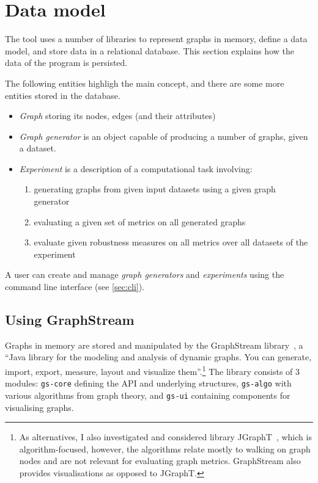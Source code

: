 \section{Data model}

The \graffs tool uses a number of libraries to represent graphs in memory, define a data model, and store data in a relational database.
This section explains how the data of the program is persisted.

The following entities highligh the main concept, and there are some more entities stored in the database.
\begin{itemize}[topsep=5pt]
    \item \textsl{Graph} storing its nodes, edges (and their attributes)
    \item \textsl{Graph generator} is an object capable of producing a number of graphs, given a dataset.
    \item \textsl{Experiment} is a description of a computational task involving:
    \begin{enumerate}[topsep=5pt]
        \item generating graphs from given input datasets using a given graph generator
        \item evaluating a given set of metrics on all generated graphs
        \item evaluate given robustness measures on all metrics over all datasets of the experiment
    \end{enumerate}
\end{itemize}

A user can create and manage \textsl{graph generators} and \textsl{experiments} using the command line interface (see \autoref{sec:cli}).

\subsection{Using GraphStream}\label{sec:graphstream}

Graphs in memory are stored and manipulated by the GraphStream library~\cite{DutotGraphStreamToolBridging2007}, a \enquote{Java library for the modeling and analysis of dynamic graphs. You can generate, import, export, measure, layout and visualize them}.\footnote{As alternatives, I also investigated and considered library JGraphT~\cite{Michail2019}, which is algorithm-focused, however, the algorithms relate mostly to walking on graph nodes and are not relevant for evaluating graph metrics.
GraphStream also provides visualisations as opposed to JGraphT.}
The library consists of 3 modules: \texttt{gs-core} defining the API and underlying structures, \texttt{gs-algo} with various algorithms from graph theory, and \texttt{gs-ui} containing components for visualising graphs.

